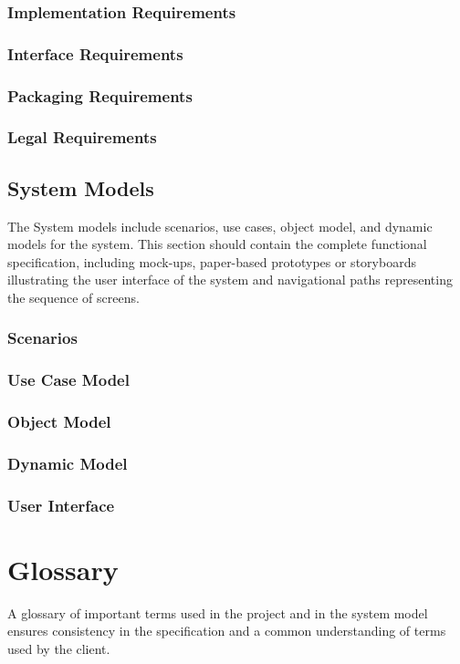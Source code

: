 \documentclass[a4paper,12pt]{scrartcl}
\newenvironment{subs}
{\adjustwidth{3em}{0pt}}
{\endadjustwidth}
\newenvironment{subsubs}
{\adjustwidth{2em}{0pt}}
{\endadjustwidth}
\begin{document}
\begin{subs}
\begin{subsubs}
            \subsubsection{Implementation Requirements}

            \subsubsection{Interface Requirements}

            \subsubsection{Packaging Requirements}

            \subsubsection{Legal Requirements}
        \end{subsubs}

        \subsection{System Models}
        The System models include scenarios, use cases, object model, and dynamic models for the system. This section should contain the complete functional specification, including mock-ups, paper-based prototypes or storyboards illustrating the user interface of the system and navigational paths representing the sequence of screens.
        \begin{subsubs}
            \subsubsection{Scenarios}

            \subsubsection{Use Case Model}

            \subsubsection{Object Model}

            \subsubsection{Dynamic Model}

            \subsubsection{User Interface}
        \end{subsubs}
    \end{subs}


    \section{Glossary}
    A glossary of important terms used in the project and in the system model ensures consistency in the specification and a common understanding of terms used by the client.
\end{document}
